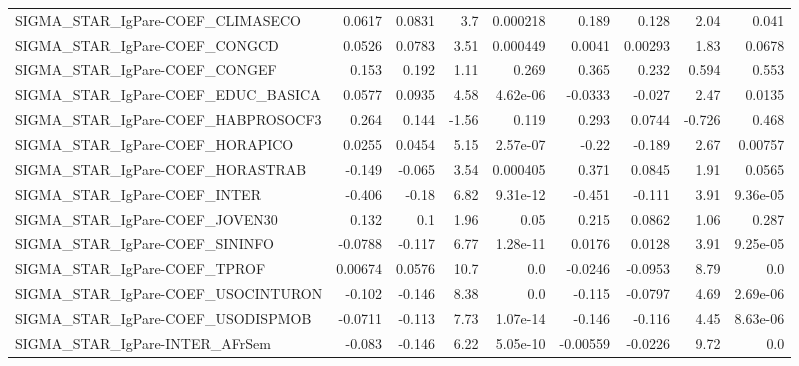 \begin{tabular}{lrrrrrrrr}
SIGMA\_STAR\_IgPare-COEF\_CLIMASECO      &      0.0617 &       0.0831 &     3.7 & 0.000218 &      0.189 &       0.128 &         2.04 &         0.041 \\
SIGMA\_STAR\_IgPare-COEF\_CONGCD         &      0.0526 &       0.0783 &    3.51 & 0.000449 &     0.0041 &     0.00293 &         1.83 &        0.0678 \\
SIGMA\_STAR\_IgPare-COEF\_CONGEF         &       0.153 &        0.192 &    1.11 &    0.269 &      0.365 &       0.232 &        0.594 &         0.553 \\
SIGMA\_STAR\_IgPare-COEF\_EDUC\_BASICA    &      0.0577 &       0.0935 &    4.58 & 4.62e-06 &    -0.0333 &      -0.027 &         2.47 &        0.0135 \\
SIGMA\_STAR\_IgPare-COEF\_HABPROSOCF3    &       0.264 &        0.144 &   -1.56 &    0.119 &      0.293 &      0.0744 &       -0.726 &         0.468 \\
SIGMA\_STAR\_IgPare-COEF\_HORAPICO       &      0.0255 &       0.0454 &    5.15 & 2.57e-07 &      -0.22 &      -0.189 &         2.67 &       0.00757 \\
SIGMA\_STAR\_IgPare-COEF\_HORASTRAB      &      -0.149 &       -0.065 &    3.54 & 0.000405 &      0.371 &      0.0845 &         1.91 &        0.0565 \\
SIGMA\_STAR\_IgPare-COEF\_INTER          &      -0.406 &        -0.18 &    6.82 & 9.31e-12 &     -0.451 &      -0.111 &         3.91 &      9.36e-05 \\
SIGMA\_STAR\_IgPare-COEF\_JOVEN30        &       0.132 &          0.1 &    1.96 &     0.05 &      0.215 &      0.0862 &         1.06 &         0.287 \\
SIGMA\_STAR\_IgPare-COEF\_SININFO        &     -0.0788 &       -0.117 &    6.77 & 1.28e-11 &     0.0176 &      0.0128 &         3.91 &      9.25e-05 \\
SIGMA\_STAR\_IgPare-COEF\_TPROF          &     0.00674 &       0.0576 &    10.7 &      0.0 &    -0.0246 &     -0.0953 &         8.79 &           0.0 \\
SIGMA\_STAR\_IgPare-COEF\_USOCINTURON    &      -0.102 &       -0.146 &    8.38 &      0.0 &     -0.115 &     -0.0797 &         4.69 &      2.69e-06 \\
SIGMA\_STAR\_IgPare-COEF\_USODISPMOB     &     -0.0711 &       -0.113 &    7.73 & 1.07e-14 &     -0.146 &      -0.116 &         4.45 &      8.63e-06 \\
SIGMA\_STAR\_IgPare-INTER\_AFrSem        &      -0.083 &       -0.146 &    6.22 & 5.05e-10 &   -0.00559 &     -0.0226 &         9.72 &           0.0 \\

\end{tabular}
